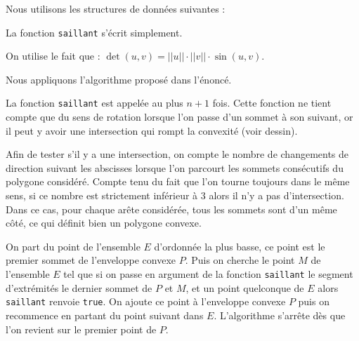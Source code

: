 \Corrige

\Q
Nous utilisons les structures de données suivantes :



La fonction \texttt{saillant} s'écrit simplement.
\medskip

On utilise le fait que : $\det(u,v)=||u||\cdot||v||\cdot\sin(u,v)$.



\Q
Nous appliquons l'algorithme proposé dans l'énoncé.



La fonction \texttt{saillant} est appelée au plus $n+1$ fois. Cette fonction ne tient compte que du sens de rotation lorsque l'on passe d'un sommet à son suivant, or il peut y avoir une intersection qui rompt la convexité (voir dessin).

\begin{center}
\end{center}

\Q
Afin de tester s'il y a une intersection, on compte le nombre de changements de direction suivant les abscisses lorsque l'on parcourt les sommets consécutifs du polygone considéré. Compte tenu du fait que l'on tourne toujours dans le même sens, si ce nombre est strictement inférieur à 3 alors il n'y a pas d'intersection. Dans ce cas, pour chaque arête considérée, tous les sommets sont d'un même côté, ce qui définit bien un polygone convexe.



\Q
On part du point de l'ensemble $E$ d'ordonnée la plus basse, ce point est le premier sommet de l'enveloppe convexe $P$. Puis on cherche le point $M$ de l'ensemble $E$ tel que si on passe en argument de la fonction \texttt{saillant} le segment d'extrémités le dernier sommet de $P$ et $M$, et un point quelconque de $E$ alors \texttt{saillant} renvoie \texttt{true}. On ajoute ce point à l'enveloppe convexe $P$ puis on recommence en partant du point suivant dans $E$. L'algorithme s'arrête dès que l'on revient sur le premier point de $P$.

